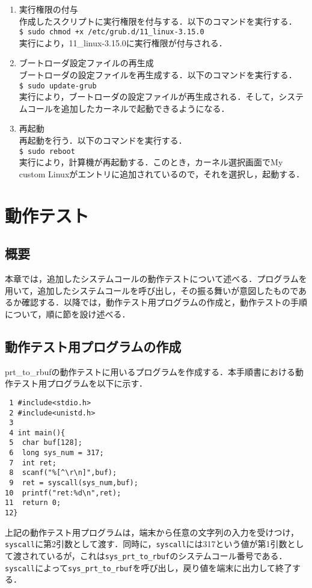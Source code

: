\documentclass[12pt]{jsarticle}
\begin{document}
\begin{enumerate}
\item 実行権限の付与\\
  作成したスクリプトに実行権限を付与する．以下のコマンドを実行する．\\
  \verb|$ sudo chmod +x /etc/grub.d/11_linux-3.15.0|\\
  実行により，11\_linux-3.15.0に実行権限が付与される．\\
\item ブートローダ設定ファイルの再生成\\
  ブートローダの設定ファイルを再生成する．以下のコマンドを実行する．\\
  \verb|$ sudo update-grub|\\
  実行により，ブートローダの設定ファイルが再生成される．そして，システムコールを追加したカーネルで起動できるようになる．\\
\item 再起動\\
  再起動を行う．以下のコマンドを実行する．\\
  \verb|$ sudo reboot|\\
  実行により，計算機が再起動する．このとき，カーネル選択画面でMy custom Linuxがエントリに追加されているので，それを選択し，起動する．
\end{enumerate}
\section{動作テスト}
\subsection{概要}
本章では，追加したシステムコールの動作テストについて述べる．プログラムを用いて，追加したシステムコールを呼び出し，その振る舞いが意図したものであるか確認する．以降では，動作テスト用プログラムの作成と，動作テストの手順について，順に節を設け述べる．
\subsection{動作テスト用プログラムの作成}
prt\_to\_rbufの動作テストに用いるプログラムを作成する．本手順書における動作テスト用プログラムを以下に示す．
\begin{verbatim}
 1 #include<stdio.h>
 2 #include<unistd.h>
 3
 4 int main(){
 5  char buf[128];
 6  long sys_num = 317;
 7  int ret;
 8  scanf("%[^\r\n]",buf);
 9  ret = syscall(sys_num,buf);
10  printf("ret:%d\n",ret);
11  return 0;
12}
\end{verbatim}
上記の動作テスト用プログラムは，端末から任意の文字列の入力を受けつけ，\verb|syscall|に第2引数として渡す．同時に，\verb|syscall|には317という値が第1引数として渡されているが，これは\verb|sys_prt_to_rbuf|のシステムコール番号である．\verb|syscall|によって\verb|sys_prt_to_rbuf|を呼び出し，戻り値を端末に出力して終了する．
\end{document}
